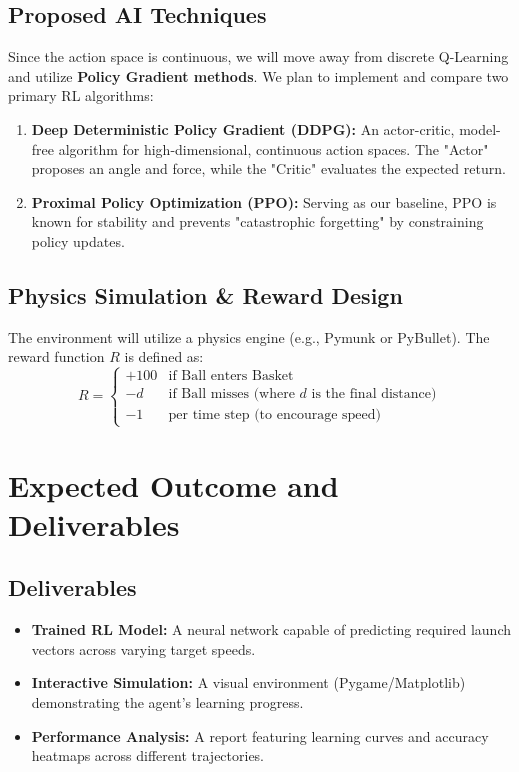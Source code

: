 \documentclass[a4paper,11pt,notitlepage]{report}
\begin{document}
\subsection*{Proposed AI Techniques}
Since the action space is continuous, we will move away from discrete Q-Learning and utilize \textbf{Policy Gradient methods}. We plan to implement and compare two primary RL algorithms:
\begin{enumerate}
    \item \textbf{Deep Deterministic Policy Gradient (DDPG):} An actor-critic, model-free algorithm for high-dimensional, continuous action spaces. The "Actor" proposes an angle and force, while the "Critic" evaluates the expected return.
    \item \textbf{Proximal Policy Optimization (PPO):} Serving as our baseline, PPO is known for stability and prevents "catastrophic forgetting" by constraining policy updates.
\end{enumerate}

\subsection*{Physics Simulation \& Reward Design}
The environment will utilize a physics engine (e.g., Pymunk or PyBullet). The reward function $R$ is defined as:
\[
R = \begin{cases} 
+100 & \text{if Ball enters Basket} \\ 
-d & \text{if Ball misses (where } d \text{ is the final distance)} \\ 
-1 & \text{per time step (to encourage speed)} 
\end{cases}
\]

\section*{Expected Outcome and Deliverables}

\subsection*{Deliverables}
\begin{itemize}
    \item \textbf{Trained RL Model:} A neural network capable of predicting required launch vectors across varying target speeds.
    \item \textbf{Interactive Simulation:} A visual environment (Pygame/Matplotlib) demonstrating the agent's learning progress.
    \item \textbf{Performance Analysis:} A report featuring learning curves and accuracy heatmaps across different trajectories.
\end{itemize}
\end{document}
